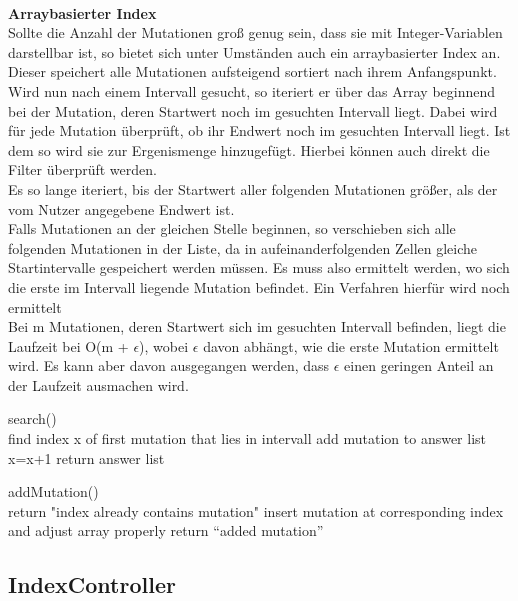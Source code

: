 \newpage\hfill\\
\textbf{Arraybasierter Index}\\
Sollte die Anzahl der Mutationen groß genug sein, dass sie mit Integer-Variablen darstellbar ist, so bietet sich unter Umständen auch ein arraybasierter Index an.\\
Dieser speichert alle Mutationen aufsteigend sortiert nach ihrem Anfangspunkt.
Wird nun nach einem Intervall gesucht, so iteriert er über das Array beginnend bei der Mutation, deren Startwert noch im gesuchten Intervall liegt. Dabei wird für jede Mutation überprüft, ob ihr Endwert noch im gesuchten Intervall liegt. Ist dem so wird sie zur Ergenismenge hinzugefügt. Hierbei können auch direkt die Filter überprüft werden.\\
Es so lange iteriert, bis der Startwert aller folgenden Mutationen größer, als der vom Nutzer angegebene Endwert ist.\\
Falls Mutationen an der gleichen Stelle beginnen, so verschieben sich alle folgenden Mutationen in der Liste, da in aufeinanderfolgenden Zellen gleiche Startintervalle gespeichert werden müssen. Es muss also ermittelt werden, wo sich die erste im Intervall liegende Mutation befindet. Ein Verfahren hierfür wird noch ermittelt\\
Bei m Mutationen, deren Startwert sich im gesuchten Intervall befinden, liegt die Laufzeit bei O(m + $\epsilon$), wobei $\epsilon$ davon abhängt, wie die erste Mutation ermittelt wird. Es kann aber davon ausgegangen werden, dass $\epsilon$ einen geringen Anteil an der Laufzeit ausmachen wird.
\begin{algorithm}
search()\\{
find index x of first mutation that lies in intervall\;
{{
{add mutation to answer list\;}
}
x=x+1\;
}
return answer list\;}

\end{algorithm}


\begin{algorithm}
addMutation()\\{
{return "index already contains mutation"\;}
insert mutation at corresponding index and adjust array properly\;
return \enquote{added mutation}\;}
\end{algorithm}
\newpage
\subsection{IndexController}
